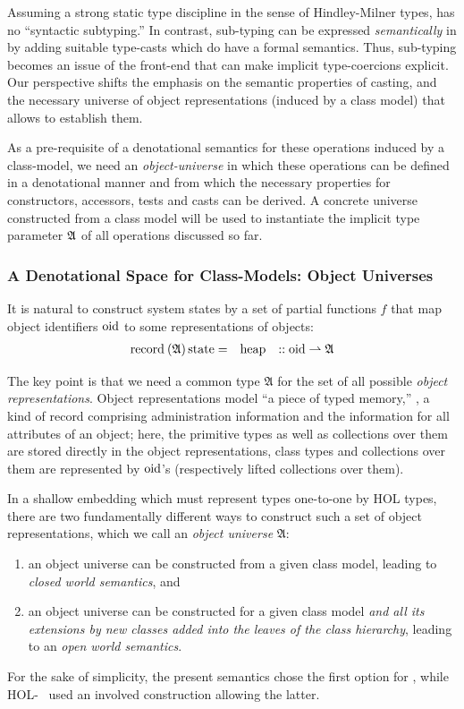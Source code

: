 Assuming a strong static type discipline in the sense of
Hindley-Milner types,  \FOCL has no ``syntactic
subtyping.''  In contrast, sub-typing can be expressed
\emph{semantically} in  \FOCL by adding suitable type-casts which do
have a formal semantics. Thus, sub-typing becomes an issue of the front-end 
that can make implicit type-coercions explicit. Our perspective shifts the 
emphasis on the semantic properties of casting, and the necessary universe of 
object representations (induced by a class model) that allows to establish
them.

As a pre-requisite of a denotational semantics for these operations induced
by a class-model, we need an \emph{object-universe} in which these operations can
be defined in a denotational manner and from which the necessary properties
for constructors, accessors, tests and casts
can be derived. A concrete universe constructed from a class model will be
used to instantiate the implicit type parameter $\mathfrak{A}$ of all \OCL operations
discussed so far.

\subsubsection{A Denotational Space for Class-Models: Object Universes}

It is natural to construct system states by a set of partial functions
$f$ that map object identifiers $\mathrm{oid}$ to some representations of
objects:
\begin{gather*}
\begin{array}{lll}
  {\operatorname{record}} \: (\mathfrak{A}) \operatorname{state} = & \operatorname{heap} & :: \mathrm{oid} \rightharpoonup {\mathfrak{A}}
\end{array}
\end{gather*}

The key point is that we need a common type $\mathfrak{A}$ for the set of all
possible \emph{object representations}.  Object representations model
``a piece of typed memory,'' \ie, a kind of record comprising
administration information and the information for all attributes of
an object; here, the primitive types as well as collections over them
are stored directly in the object representations, class types and
collections over them are represented by $\mathrm{oid}$'s (respectively lifted
collections over them).

In a shallow embedding which must represent
\UML types one-to-one by HOL types, there are two fundamentally
different ways to construct such a set of object representations,
which we call an \emph{object universe} $\mathfrak{A}$:
\begin{enumerate}
\item an object universe can be constructed from a given class model,
  leading to \emph{closed world semantics}, and
\item an object universe can be constructed for a given class model
  \emph{and all its extensions by new classes added into the leaves of
    the class hierarchy}, leading to an \emph{open world semantics}.
\end{enumerate}
For the sake of simplicity, the present semantics chose the first option for
 \FOCL, while HOL-\OCL~\cite{brucker.ea:extensible:2008-b}
used an involved construction allowing the latter.

